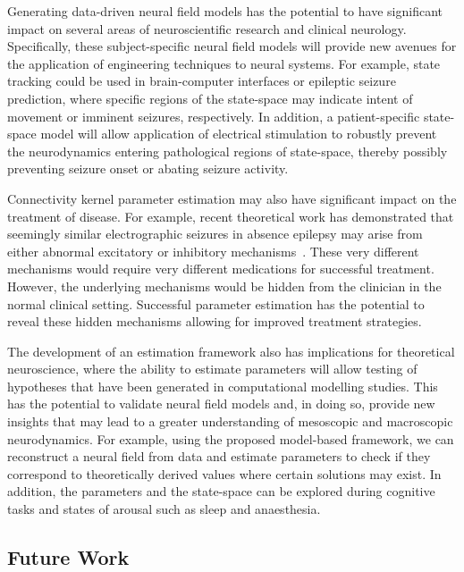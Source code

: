 \documentclass[10pt]{article}
\begin{document}
Generating data-driven neural field models has the potential to have significant impact on several areas of neuroscientific research and clinical neurology. Specifically, these subject-specific neural field models will provide new avenues for the application of engineering techniques to neural systems. For example, state tracking could be used in brain-computer interfaces or epileptic seizure prediction, where specific regions of the state-space may indicate intent of movement or imminent seizures, respectively. In addition, a patient-specific state-space model will allow application of electrical stimulation to robustly prevent the neurodynamics entering pathological regions of state-space, thereby possibly preventing seizure onset or abating seizure activity.

Connectivity kernel parameter estimation may also have significant impact on the treatment of disease. For example, recent theoretical work has demonstrated that seemingly similar electrographic seizures in absence epilepsy may arise from either abnormal excitatory or inhibitory mechanisms~\cite{Marten2009}. These very different mechanisms would require very different medications for successful treatment. However, the underlying mechanisms would be hidden from the clinician in the normal clinical setting. Successful parameter estimation has the potential to reveal these hidden mechanisms allowing for improved treatment strategies. 

The development of an estimation framework also has implications for theoretical neuroscience, where the ability to estimate parameters will allow testing of hypotheses that have been generated in computational modelling studies. This has the potential to validate neural field models and, in doing so, provide new insights that may lead to a greater understanding of mesoscopic and macroscopic neurodynamics. For example, using the proposed model-based framework, we can reconstruct a neural field from data and estimate parameters to check if they correspond to theoretically derived values where certain solutions may exist. In addition, the parameters and the state-space can be explored during cognitive tasks and states of arousal such as sleep and anaesthesia. 

\subsection*{Future Work}
\end{document}
